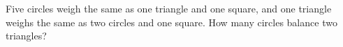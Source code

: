 Five circles weigh the same as one triangle and one square, and one triangle weighs the same as two circles and one square. How many circles balance two triangles?
